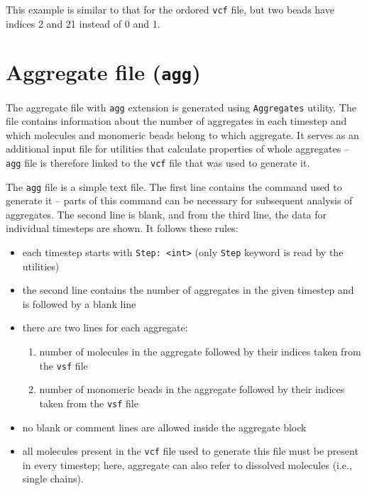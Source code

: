 This example is similar to that for the ordored \texttt{vcf} file, but two
beads have indices 2 and 21 instead of 0 and 1. %

\section{Aggregate file (\texttt{agg})} \label{sec:AggFile} %

The aggregate file with \texttt{agg} extension is generated using
\texttt{Aggregates} utility. The file
contains information about the number of aggregates in each timestep and
which molecules and monomeric beads belong to which aggregate. It serves as
an additional input file for utilities that calculate properties of whole
aggregates -- \texttt{agg} file is therefore linked to the \texttt{vcf} file
that was used to generate it.

The \texttt{agg} file is a simple text file. The first line contains the
command used to generate it -- parts of this command can be necessary for
subsequent analysis of aggregates. The second line is blank, and from the
third line, the data for individual timesteps are shown. It follows these
rules:

\begin{itemize}[topsep=0pt,itemsep=0pt]
  \item each timestep starts with \texttt{Step: <int>} (only \texttt{Step}
    keyword is read by the utilities)
  \item the second line contains the number of aggregates in the given
    timestep and is followed by a blank line
  \item there are two lines for each aggregate:
  \begin{enumerate}[topsep=0pt,itemsep=0pt]
    \item number of molecules in the aggregate followed by their indices
      taken from the \texttt{vsf} file
    \item number of monomeric beads in the aggregate followed by their
      indices taken from the \texttt{vsf} file
  \end{enumerate}
  \item no blank or comment lines are allowed inside the aggregate block
  \item all molecules present in the \texttt{vcf} file used to generate
    this file must be present in every timestep; here, aggregate can also
    refer to dissolved molecules (i.e., single chains).
\end{itemize}


